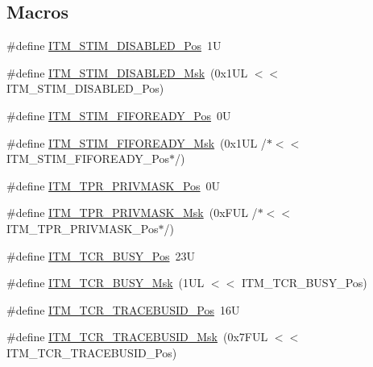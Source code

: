 \subsection*{Macros}
\begin{DoxyCompactItemize}
\item 
\#define \mbox{\hyperlink{group___c_m_s_i_s___i_t_m_gafd9ed85f36233685f182cc249621e025}{I\+T\+M\+\_\+\+S\+T\+I\+M\+\_\+\+D\+I\+S\+A\+B\+L\+E\+D\+\_\+\+Pos}}~1U
\item 
\#define \mbox{\hyperlink{group___c_m_s_i_s___i_t_m_ga9d8f821bdad48c7b4a02f11ebf2c8852}{I\+T\+M\+\_\+\+S\+T\+I\+M\+\_\+\+D\+I\+S\+A\+B\+L\+E\+D\+\_\+\+Msk}}~(0x1\+U\+L $<$$<$ I\+T\+M\+\_\+\+S\+T\+I\+M\+\_\+\+D\+I\+S\+A\+B\+L\+E\+D\+\_\+\+Pos)
\item 
\#define \mbox{\hyperlink{group___c_m_s_i_s___i_t_m_gaa79f3a59d15d810d48d924c0ca4ae0b9}{I\+T\+M\+\_\+\+S\+T\+I\+M\+\_\+\+F\+I\+F\+O\+R\+E\+A\+D\+Y\+\_\+\+Pos}}~0U
\item 
\#define \mbox{\hyperlink{group___c_m_s_i_s___i_t_m_ga73dc88e3338b4ef9a81e53a1d2c5ae83}{I\+T\+M\+\_\+\+S\+T\+I\+M\+\_\+\+F\+I\+F\+O\+R\+E\+A\+D\+Y\+\_\+\+Msk}}~(0x1\+U\+L /$\ast$$<$$<$ I\+T\+M\+\_\+\+S\+T\+I\+M\+\_\+\+F\+I\+F\+O\+R\+E\+A\+D\+Y\+\_\+\+Pos$\ast$/)
\item 
\#define \mbox{\hyperlink{group___c_m_s_i_s___i_t_m_ga7abe5e590d1611599df87a1884a352e8}{I\+T\+M\+\_\+\+T\+P\+R\+\_\+\+P\+R\+I\+V\+M\+A\+S\+K\+\_\+\+Pos}}~0U
\item 
\#define \mbox{\hyperlink{group___c_m_s_i_s___i_t_m_ga168e089d882df325a387aab3a802a46b}{I\+T\+M\+\_\+\+T\+P\+R\+\_\+\+P\+R\+I\+V\+M\+A\+S\+K\+\_\+\+Msk}}~(0x\+F\+U\+L /$\ast$$<$$<$ I\+T\+M\+\_\+\+T\+P\+R\+\_\+\+P\+R\+I\+V\+M\+A\+S\+K\+\_\+\+Pos$\ast$/)
\item 
\#define \mbox{\hyperlink{group___c_m_s_i_s___i_t_m_ga9174ad4a36052c377cef4e6aba2ed484}{I\+T\+M\+\_\+\+T\+C\+R\+\_\+\+B\+U\+S\+Y\+\_\+\+Pos}}~23U
\item 
\#define \mbox{\hyperlink{group___c_m_s_i_s___i_t_m_ga43ad7cf33de12f2ef3a412d4f354c60f}{I\+T\+M\+\_\+\+T\+C\+R\+\_\+\+B\+U\+S\+Y\+\_\+\+Msk}}~(1\+U\+L $<$$<$ I\+T\+M\+\_\+\+T\+C\+R\+\_\+\+B\+U\+S\+Y\+\_\+\+Pos)
\item 
\#define \mbox{\hyperlink{group___c_m_s_i_s___i_t_m_ga113bf41ed31584360ad7d865e5e0ace7}{I\+T\+M\+\_\+\+T\+C\+R\+\_\+\+T\+R\+A\+C\+E\+B\+U\+S\+I\+D\+\_\+\+Pos}}~16U
\item 
\#define \mbox{\hyperlink{group___c_m_s_i_s___i_t_m_gac014c7345304ed245b642eb9d6e9a302}{I\+T\+M\+\_\+\+T\+C\+R\+\_\+\+T\+R\+A\+C\+E\+B\+U\+S\+I\+D\+\_\+\+Msk}}~(0x7\+F\+U\+L $<$$<$ I\+T\+M\+\_\+\+T\+C\+R\+\_\+\+T\+R\+A\+C\+E\+B\+U\+S\+I\+D\+\_\+\+Pos)
$$
\end{DoxyCompactItemize}
